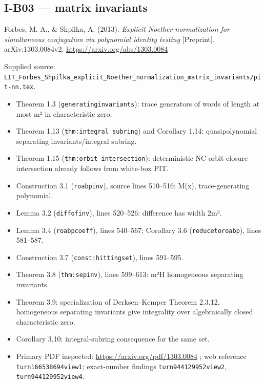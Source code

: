 \documentclass[11pt,a4paper]{article}
\providecommand{\tightlist}{\setlength{\itemsep}{0pt}\setlength{\parskip}{0pt}}
\theoremstyle{definition}\newtheorem{definition}{Definition}
\begin{document}
\subsection{I-B03 --- matrix invariants}\label{i-b03--matrix-invariants}

Forbes, M. A., \& Shpilka, A. (2013). \emph{Explicit Noether
normalization for simultaneous conjugation via polynomial identity
testing} {[}Preprint{]}. arXiv:1303.0084v2.
\url{https://arxiv.org/abs/1303.0084}

Supplied source:
\texttt{LIT\_Forbes\_Shpilka\_explicit\_Noether\_normalization\_matrix\_invariants/pit-nn.tex}.

\begin{itemize}
\tightlist
\item
  Theorem 1.3 (\texttt{generatinginvariants}): trace generators of words
  of length at most m² in characteristic zero.
\item
  Theorem 1.13 (\texttt{thm:integral\ subring}) and Corollary 1.14:
  quasipolynomial separating invariants/integral subring.
\item
  Theorem 1.15 (\texttt{thm:orbit\ intersection}): deterministic NC
  orbit-closure intersection already follows from white-box PIT.
\item
  Construction 3.1 (\texttt{roabpinv}), source lines 510--516: M(x),
  trace-generating polynomial.
\item
  Lemma 3.2 (\texttt{diffofinv}), lines 520--526: difference has width
  2m².
\item
  Lemma 3.4 (\texttt{roabpcoeff}), lines 540--567; Corollary 3.6
  (\texttt{reducetoroabp}), lines 581--587.
\item
  Construction 3.7 (\texttt{const:hittingset}), lines 591--595.
\item
  Theorem 3.8 (\texttt{thm:sepinv}), lines 599--613:
  m²\textbar H\textbar{} homogeneous separating invariants.
\item
  Theorem 3.9: specialization of Derksen--Kemper Theorem 2.3.12,
  homogeneous separating invariants give integrality over algebraically
  closed characteristic zero.
\item
  Corollary 3.10: integral-subring consequence for the same set.
\item
  Primary PDF inspected: \url{https://arxiv.org/pdf/1303.0084} ; web
  reference \texttt{turn166538694view1}; exact-number findings
  \texttt{turn944129952view2}, \texttt{turn944129952view4}.
\end{itemize}
\end{document}
